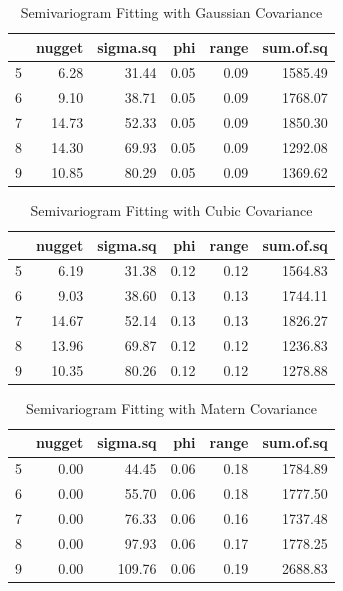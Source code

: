 \documentclass[hidelinks,12pt]{article}
\begin{document}
	\begin{table}[!ht]
		\centering
		\caption{Semivariogram Fitting with Gaussian Covariance \label{semgau}}
		\begin{tabular}{rrrrrr}
			\hline
			& nugget & sigma.sq & phi & range & sum.of.sq \\ 
			\hline
			5 & 6.28 & 31.44 & 0.05 & 0.09 & 1585.49 \\ 
			6 & 9.10 & 38.71 & 0.05 & 0.09 & 1768.07 \\ 
			7 & 14.73 & 52.33 & 0.05 & 0.09 & 1850.30 \\ 
			8 & 14.30 & 69.93 & 0.05 & 0.09 & 1292.08 \\ 
			9 & 10.85 & 80.29 & 0.05 & 0.09 & 1369.62 \\ 
			\hline
		\end{tabular}
	\end{table}
	\begin{table}[!ht]
		\centering
		\caption{Semivariogram Fitting with Cubic Covariance \label{semcub}}
		\begin{tabular}{rrrrrr}
			\hline
			& nugget & sigma.sq & phi & range & sum.of.sq \\ 
			\hline
			5 & 6.19 & 31.38 & 0.12 & 0.12 & 1564.83 \\ 
			6 & 9.03 & 38.60 & 0.13 & 0.13 & 1744.11 \\ 
			7 & 14.67 & 52.14 & 0.13 & 0.13 & 1826.27 \\ 
			8 & 13.96 & 69.87 & 0.12 & 0.12 & 1236.83 \\ 
			9 & 10.35 & 80.26 & 0.12 & 0.12 & 1278.88 \\ 
			\hline
		\end{tabular}
	\end{table}
	\begin{table}[!ht]
		\centering
		\caption{Semivariogram Fitting with Matern Covariance \label{semmat}}
		\begin{tabular}{rrrrrr}
			\hline
			& nugget & sigma.sq & phi & range & sum.of.sq \\ 
			\hline
			5 & 0.00 & 44.45 & 0.06 & 0.18 & 1784.89 \\ 
			6 & 0.00 & 55.70 & 0.06 & 0.18 & 1777.50 \\ 
			7 & 0.00 & 76.33 & 0.06 & 0.16 & 1737.48 \\ 
			8 & 0.00 & 97.93 & 0.06 & 0.17 & 1778.25 \\ 
			9 & 0.00 & 109.76 & 0.06 & 0.19 & 2688.83 \\ 
			\hline
		\end{tabular}
	\end{table}
\end{document}
